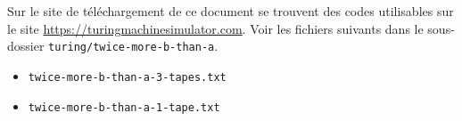 Sur le site de téléchargement de ce document se trouvent des codes utilisables sur le site \url{https://turingmachinesimulator.com}.
Voir les fichiers suivants dans le sous-dossier \verb+turing/twice-more-b-than-a+.
\begin{itemize}[label=\small\textbullet]
	\item \verb+twice-more-b-than-a-3-tapes.txt+

	\item \verb+twice-more-b-than-a-1-tape.txt+ 
\end{itemize}
